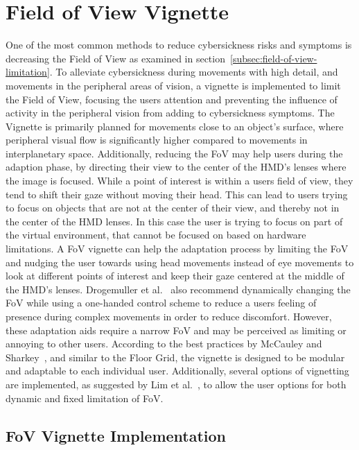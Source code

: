 \section{Field of View Vignette}\label{sec:field-of-view-vignette}

One of the most common methods to reduce cybersickness risks and symptoms is decreasing the Field of
View as examined in section~\ref{subsec:field-of-view-limitation}.
To alleviate cybersickness during movements with high detail, and movements in the peripheral areas of vision, a
vignette is implemented to limit the Field of View, focusing the users attention and preventing the influence of
activity in the peripheral vision from adding to cybersickness symptoms.
The Vignette is primarily planned for movements close to an object's surface, where peripheral visual flow is
significantly higher compared to movements in interplanetary space.
Additionally, reducing the FoV may help users during the adaption phase, by directing their view to the center of the
HMD's lenses where the image is focused.
While a point of interest is within a users field of view, they tend to shift their gaze without moving their head.
This can lead to users trying to focus on objects that are not at the center of their view, and thereby not in the
center of the HMD lenses.
In this case the user is trying to focus on part of the virtual environment, that cannot be focused on based on
hardware limitations.
A FoV vignette can help the adaptation process by limiting the FoV and nudging the user towards using head movements
instead of eye movements to look at different points of interest and keep their gaze centered at the middle of the
HMD's lenses.
Drogemuller et al.~\cite{Drogemuller2020} also recommend dynamically changing the FoV while using a one-handed
control scheme to reduce a users feeling of presence during complex movements in order to reduce discomfort.
However, these adaptation aids require a narrow FoV and may be perceived as limiting or annoying to other users.
According to the best practices by McCauley and Sharkey~\cite{McCauley1992}, and similar to the Floor Grid, the
vignette is designed to be modular and adaptable to each individual user.
Additionally, several options of vignetting are implemented, as suggested by Lim et al.~\cite{Lim2020}, to allow the
user options for both dynamic and fixed limitation of FoV\@.


\subsection{FoV Vignette Implementation}\label{subsec:fov-vignette-implementation}

